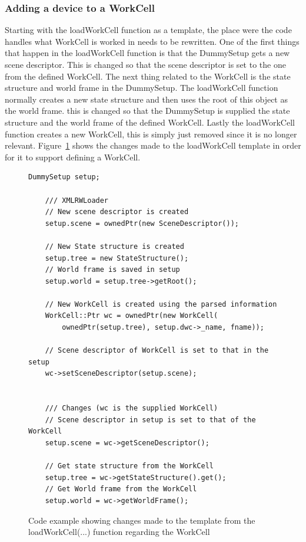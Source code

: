 \subsubsection{Adding a device to a WorkCell}
Starting with the loadWorkCell function as a template, the place were the code handles what WorkCell is worked in needs to be rewritten. One of the first things that happen in the loadWorkCell function is that the DummySetup gets a new scene descriptor. This is changed so that the scene descriptor is set to the one from the defined WorkCell. The next thing related to the WorkCell is the state structure and world frame in the DummySetup. The loadWorkCell function normally creates a new state structure and then uses the root of this object as the world frame. this is changed so that the DummySetup is supplied the state structure and the world frame of the defined WorkCell. Lastly the loadWorkCell function creates a new WorkCell, this is simply just removed since it is no longer relevant. Figure~\ref{fig:ChangedInLoaderWorkCell} shows the changes made to the loadWorkCell template in order for it to support defining a WorkCell.

\begin{figure}[h]
	\centering
	\lstset{language=C++} 
	\begin{lstlisting}[frame=single]
	DummySetup setup;
	
	/// XMLRWLoader
	// New scene descriptor is created
	setup.scene = ownedPtr(new SceneDescriptor());
	
	// New State structure is created
	setup.tree = new StateStructure();
	// World frame is saved in setup
	setup.world = setup.tree->getRoot();
	
	// New WorkCell is created using the parsed information
	WorkCell::Ptr wc = ownedPtr(new WorkCell(
		ownedPtr(setup.tree), setup.dwc->_name, fname));
		
	// Scene descriptor of WorkCell is set to that in the setup
	wc->setSceneDescriptor(setup.scene);
	
	
	/// Changes	(wc is the supplied WorkCell)
	// Scene descriptor in setup is set to that of the WorkCell
	setup.scene = wc->getSceneDescriptor();
	
	// Get state structure from the WorkCell
	setup.tree = wc->getStateStructure().get();
	// Get World frame from the WorkCell
	setup.world = wc->getWorldFrame();
	\end{lstlisting}
	\caption{Code example showing changes made to the template from the loadWorkCell(...) function regarding the WorkCell}
	\label{fig:ChangedInLoaderWorkCell}
\end{figure}

